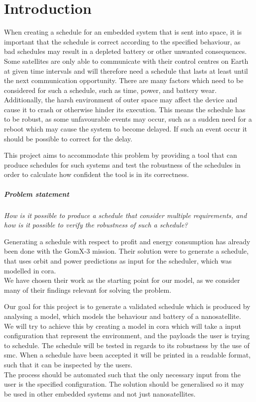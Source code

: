 \chapter{Introduction} \label{cha:intro}
When creating a schedule for an embedded system that is sent into space, it is important that the schedule is correct according to the specified behaviour, as bad schedules may result in a depleted battery or other unwanted consequences. 
Some satellites are only able to communicate with their control centres on Earth at given time intervals and will therefore need a schedule that lasts at least until the next communication opportunity.
There are many factors which need to be considered for such a schedule, such as time, power, and battery wear. 
Additionally, the harsh environment of outer space may affect the device and cause it to crash or otherwise hinder its execution.
This means the schedule has to be robust, as some unfavourable events may occur, such as a sudden need for a reboot which may cause the system to become delayed. 
If such an event occur it should be possible to correct for the delay.

This project aims to accommodate this problem by providing a tool that can produce schedules for such systems and test the robustness of the schedules in order to calculate how confident the tool is in its correctness.

\paragraph{Problem statement}
\textit{How is it possible to produce a schedule that consider multiple requirements, and how is it possible to verify the robustness of such a schedule?}

Generating a schedule with respect to profit and energy consumption has already been done with the GomX-3 mission\cite{gomx3}.
Their solution were to generate a schedule, that uses orbit and power predictions as input for the scheduler, which was modelled in \gls{cora}.\\
We have chosen their work as the starting point for our model, as we consider many of their findings relevant for solving the problem.

Our goal for this project is to generate a validated schedule which is produced by analysing a model, which models the behaviour and battery of a nanosatellite.\\
We will try to achieve this by creating a model in \gls{cora} which will take a input configuration that represent the environment, and the payloads the user is trying to schedule.
The schedule will be tested in regards to its robustness by the use of \gls{smc}. %
When a schedule have been accepted it will be printed in a readable format, such that it can be inspected by the users.\\
The process should be automated such that the only necessary input from the user is the specified configuration.
The solution should be generalised so it may be used in other embedded systems and not just nanosatellites.
